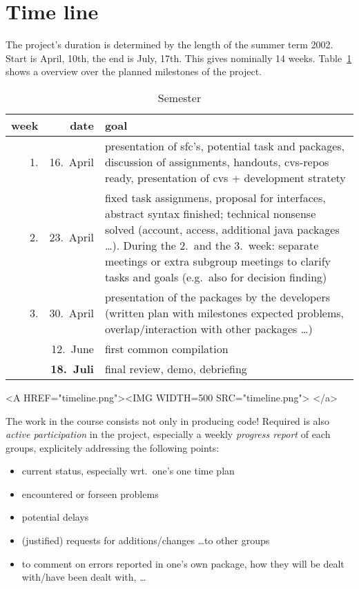 
\section*{Time line}
\label{sec:timeline}



The project's duration is determined by the length of the summer term 2002.
Start is April, 10th, the end is July, 17th. This gives nominally 14 weeks.
Table~\ref{tab:semester} shows a overview over the planned milestones of
the project.

\begin{table}[htbp]
  \begin{center}
    \begin{tabular}{rrp{9cm}}
      week & date & goal
      \\\hline
      1. & 16.\ April  &  presentation of sfc's, potential task and packages,
      discussion of assignments, handouts, cvs-repos ready, presentation
      of cvs + development stratety
      \\
      2. & 23.\ April  &  fixed task assignmens, proposal for interfaces,
      abstract syntax finished; technical  nonsense solved (account,
      access, additional java packages \ldots).
      During the 2.\ and the 3.\ week: separate meetings or extra subgroup
      meetings to clarify tasks and goals (e.g.\ also  for decision finding)
      \\
      3. & 30.\ April & 
      presentation of the packages by the developers (written plan with
      milestones expected problems, overlap/interaction with other packages
      \ldots)
      \\
      & 12.\ June &
      first common compilation
      \\
       & \textbf{18.\ Juli} & final review, demo, debriefing
    \end{tabular}
    \caption{Semester}
    \label{tab:semester}
  \end{center}
\end{table}


\begin{rawhtml}
  <A HREF="timeline.png"><IMG  WIDTH=500 SRC="timeline.png"> </a>
\end{rawhtml}



The work in the course consists not only in producing code!  Required is
also \emph{active participation} in the project, especially a weekly
\emph{progress report} of each groups, explicitely addressing the following
points:
\begin{itemize}
\item current status, especially wrt.\ one's one time plan
\item encountered or forseen problems
\item potential delays
\item (justified) requests for additions/changes \ldots to other groups
\item to comment on errors reported in one's own package, how they will be
  dealt with/have been dealt with, \ldots
\end{itemize}



